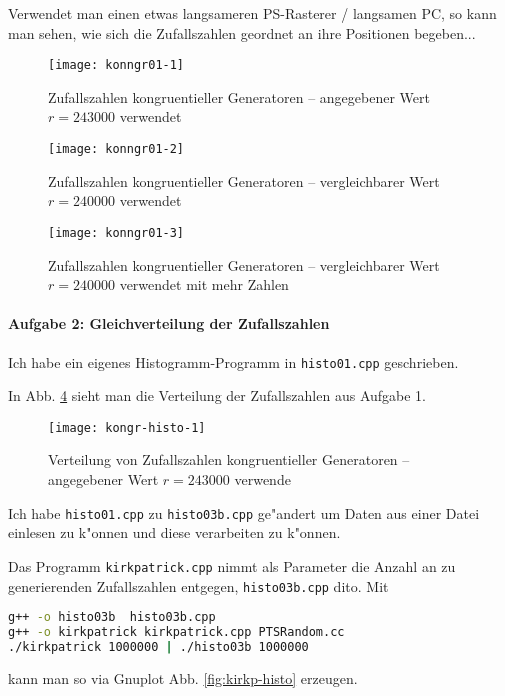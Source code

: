 \documentclass[a4paper,12pt]{article}
\begin{document}
Verwendet man einen etwas langsameren PS-Rasterer / langsamen PC, so
kann man sehen, wie sich die Zufallszahlen geordnet an ihre Positionen begeben...

\begin{figure}
  \centering
  \texttt{[image: konngr01-1]}
  \caption{Zufallszahlen kongruentieller Generatoren -- angegebener Wert $r = 243000$ verwendet}
  \label{fig:kongr01}
\end{figure}

\begin{figure}
  \centering
  \texttt{[image: konngr01-2]}
  \caption{Zufallszahlen kongruentieller Generatoren -- vergleichbarer
    Wert $r = 240000$ verwendet}
  \label{fig:kongr02}
\end{figure}

\begin{figure}
  \centering
  \texttt{[image: konngr01-3]}
  \caption{Zufallszahlen kongruentieller Generatoren -- vergleichbarer
    Wert $r = 240000$ verwendet mit mehr Zahlen}
  \label{fig:kongr03}
\end{figure}




\paragraph{Aufgabe 2: Gleichverteilung der Zufallszahlen}
\label{sec:aufg_2:_gleichv_der_zufallsz}

Ich habe ein eigenes Histogramm-Programm in \texttt{histo01.cpp}
geschrieben.

In Abb. \ref{fig:kongr-histo} sieht man die Verteilung der
Zufallszahlen aus Aufgabe 1.

\begin{figure}
  \centering
  \texttt{[image: kongr-histo-1]}
  \caption{Verteilung von Zufallszahlen kongruentieller Generatoren -- angegebener Wert $r = 243000$ verwende}
  \label{fig:kongr-histo}
\end{figure}

Ich habe \texttt{histo01.cpp} zu \texttt{histo03b.cpp} ge"andert um
Daten aus einer Datei einlesen zu k"onnen und diese verarbeiten zu
k"onnen.

Das Programm \texttt{kirkpatrick.cpp} nimmt als Parameter die Anzahl
an zu generierenden Zufallszahlen entgegen, \texttt{histo03b.cpp}
dito. Mit
\begin{lstlisting}[language=bash]
g++ -o histo03b  histo03b.cpp
g++ -o kirkpatrick kirkpatrick.cpp PTSRandom.cc 
./kirkpatrick 1000000 | ./histo03b 1000000
\end{lstlisting}
kann man so via Gnuplot Abb. \ref{fig:kirkp-histo} erzeugen.
\end{document}
